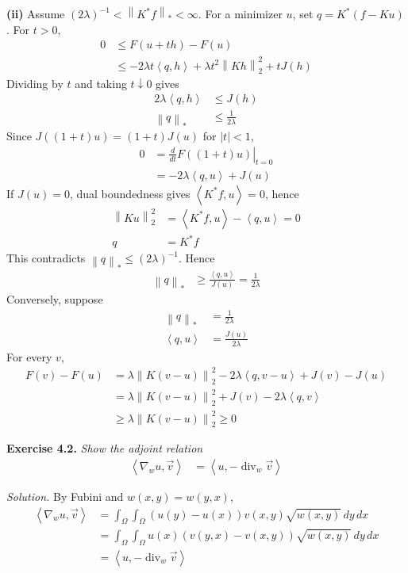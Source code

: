 \documentclass[12pt,letterpaper]{article}
\newcommand{\diver}{\operatorname{div}}
\newcommand{\norm}[1]{\left\lVert #1\right\rVert}
\newcommand{\ip}[2]{\left\langle #1,#2\right\rangle}
\newcommand{\exercise}[1]{%
  \par\bigskip\noindent\textbf{Exercise #1.}\enspace}
\newenvironment{statement}{\itshape\ignorespaces}{\par}
\newcommand{\solution}{\par\medskip\noindent\textit{Solution.}\enspace}
\newcommand{\partlabel}[1]{\par\medskip\noindent\textbf{(#1)}\enspace}
\begin{document}
\partlabel{ii}
Assume $(2\lambda)^{-1}<\norm{K^*f}_*<\infty$.
For a minimizer $u$, set $q=K^*(f-Ku)$. For $t>0$,
\begin{align*}
 0&\leq F(u+th)-F(u)\\
 &\leq-2\lambda t\ip{q}{h}+\lambda t^2\norm{Kh}_2^2+tJ(h)
\end{align*}
Dividing by $t$ and taking $t\downarrow0$ gives
\begin{align*}
 2\lambda\ip{q}{h}&\leq J(h)\\
 \norm{q}_*&\leq\frac1{2\lambda}
\end{align*}
Since $J((1+t)u)=(1+t)J(u)$ for $|t|<1$,
\begin{align*}
 0&=\left.\frac{d}{dt}F((1+t)u)\right|_{t=0}\\
 &=-2\lambda\ip{q}{u}+J(u)
\end{align*}
If $J(u)=0$, dual boundedness gives $\ip{K^*f}{u}=0$, hence
\begin{align*}
 \norm{Ku}_2^2&=\ip{K^*f}{u}-\ip{q}{u}=0\\
 q&=K^*f
\end{align*}
This contradicts $\norm{q}_*\leq(2\lambda)^{-1}$. Hence
\begin{align*}
 \norm{q}_*&\geq\frac{\ip{q}{u}}{J(u)}=\frac1{2\lambda}
\end{align*}
Conversely, suppose
\begin{align*}
 \norm{q}_*&=\frac1{2\lambda}\\
 \ip{q}{u}&=\frac{J(u)}{2\lambda}
\end{align*}
For every $v$,
\begin{align*}
 F(v)-F(u)
 &=\lambda\norm{K(v-u)}_2^2-2\lambda\ip{q}{v-u}+J(v)-J(u)\\
 &=\lambda\norm{K(v-u)}_2^2+J(v)-2\lambda\ip{q}{v}\\
 &\geq\lambda\norm{K(v-u)}_2^2\geq0
 \tag*{$\square$}
\end{align*}

\begin{samepage}
\exercise{4.2}
\begin{statement}
Show the adjoint relation
\begin{align*}
 \ip{\nabla_wu}{\vec v}&=\ip{u}{-\diver_w\vec v}
\end{align*}
\end{statement}
\solution
By Fubini and $w(x,y)=w(y,x)$,
\begin{align*}
 \ip{\nabla_wu}{\vec v}
 &=\int_\Omega\int_\Omega
   (u(y)-u(x))v(x,y)\sqrt{w(x,y)}\,dy\,dx\\
 &=\int_\Omega\int_\Omega
   u(x)(v(y,x)-v(x,y))\sqrt{w(x,y)}\,dy\,dx\\
 &=\ip{u}{-\diver_w\vec v}
 \tag*{$\square$}
\end{align*}
\end{samepage}
\end{document}
